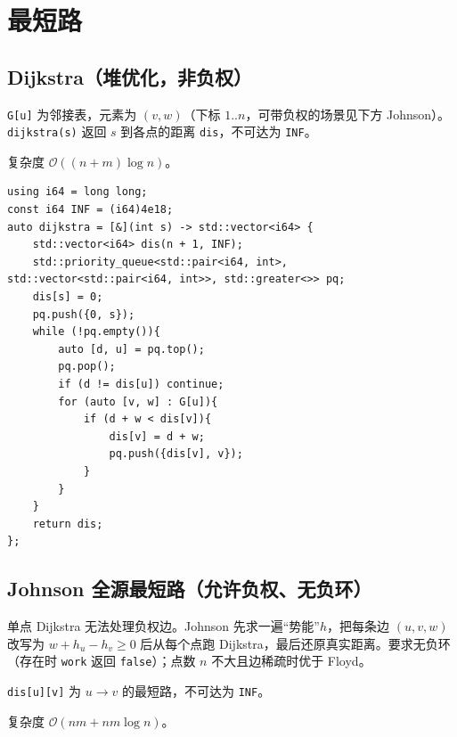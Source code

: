 \section{最短路}

\subsection{Dijkstra（堆优化，非负权）}

\verb|G[u]| 为邻接表，元素为 $(v,w)$（下标 $1..n$，可带负权的场景见下方 Johnson）。\verb|dijkstra(s)| 返回 $s$ 到各点的距离 \texttt{dis}，不可达为 \texttt{INF}。

复杂度 $\mathcal{O}((n+m)\log n)$。

\begin{lstlisting}
using i64 = long long;
const i64 INF = (i64)4e18;
auto dijkstra = [&](int s) -> std::vector<i64> {
    std::vector<i64> dis(n + 1, INF);
    std::priority_queue<std::pair<i64, int>, std::vector<std::pair<i64, int>>, std::greater<>> pq;
    dis[s] = 0;
    pq.push({0, s});
    while (!pq.empty()){
        auto [d, u] = pq.top();
        pq.pop();
        if (d != dis[u]) continue;
        for (auto [v, w] : G[u]){
            if (d + w < dis[v]){
                dis[v] = d + w;
                pq.push({dis[v], v});
            }
        }
    }
    return dis;
};
\end{lstlisting}

\subsection{Johnson 全源最短路（允许负权、无负环）}

单点 Dijkstra 无法处理负权边。Johnson 先求一遍“势能”$h$，把每条边 $(u,v,w)$ 改写为 $w+h_u-h_v\ge 0$ 后从每个点跑 Dijkstra，最后还原真实距离。要求无负环（存在时 \verb|work| 返回 \texttt{false}）；点数 $n$ 不大且边稀疏时优于 Floyd。

\verb|dis[u][v]| 为 $u\to v$ 的最短路，不可达为 \texttt{INF}。

复杂度 $\mathcal{O}(nm + nm\log n)$。

